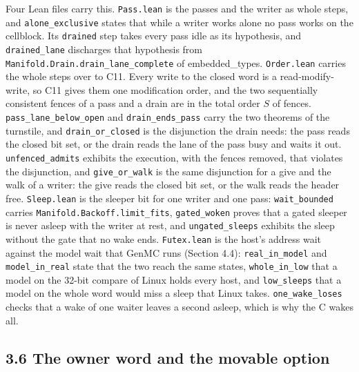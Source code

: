 Four Lean files carry this. \texttt{Pass.\allowbreak{}lean} is the passes and the writer as whole steps, and \texttt{alone\_\allowbreak{}exclusive} states that while a writer works alone no pass works on the cellblock. Its \texttt{drained} step takes every pass idle as its hypothesis, and \texttt{drained\_\allowbreak{}lane} discharges that hypothesis from \texttt{Manifold.\allowbreak{}Drain.\allowbreak{}drain\_\allowbreak{}lane\_\allowbreak{}complete} of embedded\_\allowbreak{}types. \texttt{Order.\allowbreak{}lean} carries the whole steps over to C11. Every write to the closed word is a read-modify-write, so C11 gives them one modification order, and the two sequentially consistent fences of a pass and a drain are in the total order \(S\) of fences. \texttt{pass\_\allowbreak{}lane\_\allowbreak{}below\_\allowbreak{}open} and \texttt{drain\_\allowbreak{}ends\_\allowbreak{}pass} carry the two theorems of the turnstile, and \texttt{drain\_\allowbreak{}or\_\allowbreak{}closed} is the disjunction the drain needs: the pass reads the closed bit set, or the drain reads the lane of the pass busy and waits it out. \texttt{unfenced\_\allowbreak{}admits} exhibits the execution, with the fences removed, that violates the disjunction, and \texttt{give\_\allowbreak{}or\_\allowbreak{}walk} is the same disjunction for a give and the walk of a writer: the give reads the closed bit set, or the walk reads the header free. \texttt{Sleep.\allowbreak{}lean} is the sleeper bit for one writer and one pass: \texttt{wait\_\allowbreak{}bounded} carries \texttt{Manifold.\allowbreak{}Backoff.\allowbreak{}limit\_\allowbreak{}fits}, \texttt{gated\_\allowbreak{}woken} proves that a gated sleeper is never asleep with the writer at rest, and \texttt{ungated\_\allowbreak{}sleeps} exhibits the sleep without the gate that no wake ends. \texttt{Futex.\allowbreak{}lean} is the host's address wait against the model wait that GenMC runs (Section 4.4): \texttt{real\_\allowbreak{}in\_\allowbreak{}model} and \texttt{model\_\allowbreak{}in\_\allowbreak{}real} state that the two reach the same states, \texttt{whole\_\allowbreak{}in\_\allowbreak{}low} that a model on the 32-bit compare of Linux holds every host, and \texttt{low\_\allowbreak{}sleeps} that a model on the whole word would miss a sleep that Linux takes. \texttt{one\_\allowbreak{}wake\_\allowbreak{}loses} checks that a wake of one waiter leaves a second asleep, which is why the C wakes all.

\subsection{\texorpdfstring{3.6 The owner word and the movable option}{3.6 The owner word and the movable option}}

